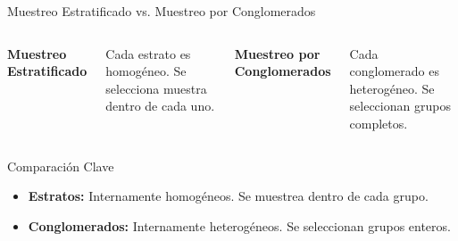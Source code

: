 \documentclass{beamer}
\begin{document}
\begin{frame}{Muestreo Estratificado vs. Muestreo por Conglomerados}
\begin{columns}
\centering
\textbf{Muestreo Estratificado} \\[1ex]

\vspace{1ex}
\scriptsize
Cada estrato es homogéneo. Se selecciona muestra dentro de cada uno.

\centering
\textbf{Muestreo por Conglomerados} \\[1ex]

\vspace{1ex}
\scriptsize
Cada conglomerado es heterogéneo. Se seleccionan grupos completos.
\end{columns}

\vspace{1ex}
\begin{block}{Comparación Clave}
\begin{itemize}
    \item \textbf{Estratos:} Internamente homogéneos. Se muestrea dentro de cada grupo.
    \item \textbf{Conglomerados:} Internamente heterogéneos. Se seleccionan grupos enteros.
\end{itemize}
\end{block}
\end{frame}
\end{document}
